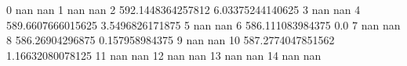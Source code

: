 0 nan nan
1 nan nan
2 592.1448364257812 6.03375244140625
3 nan nan
4 589.6607666015625 3.5496826171875
5 nan nan
6 586.111083984375 0.0
7 nan nan
8 586.26904296875 0.157958984375
9 nan nan
10 587.2774047851562 1.16632080078125
11 nan nan
12 nan nan
13 nan nan
14 nan nan
